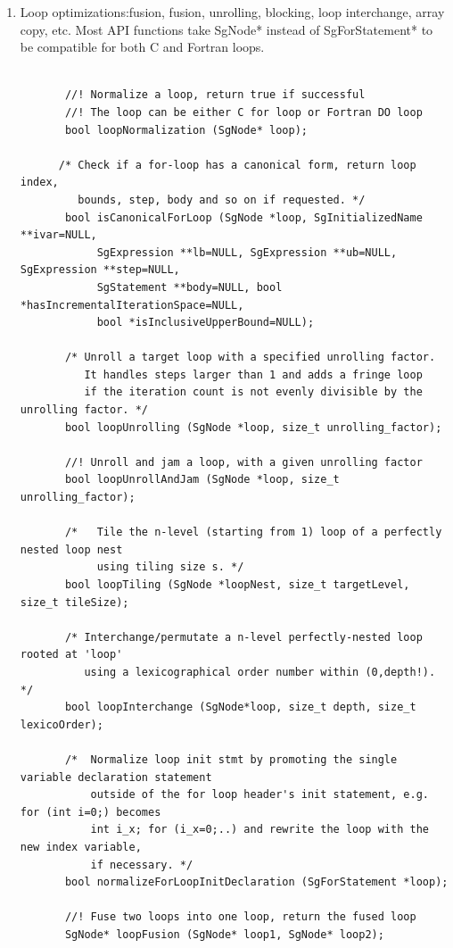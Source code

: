\begin{enumerate}
\begin{enumerate}
\begin{lstlisting}
      \end{lstlisting}
      \item Loop optimizations:fusion, fusion, unrolling, blocking, loop
                  interchange, array copy, etc.
Most API functions take SgNode* instead of SgForStatement* to be compatible for both C and Fortran loops.
       \begin{lstlisting}

       //! Normalize a loop, return true if successful
       //! The loop can be either C for loop or Fortran DO loop
       bool loopNormalization (SgNode* loop);

      /* Check if a for-loop has a canonical form, return loop index, 
         bounds, step, body and so on if requested. */
       bool isCanonicalForLoop (SgNode *loop, SgInitializedName **ivar=NULL, 
            SgExpression **lb=NULL, SgExpression **ub=NULL, SgExpression **step=NULL, 
            SgStatement **body=NULL, bool *hasIncrementalIterationSpace=NULL, 
            bool *isInclusiveUpperBound=NULL);

       /* Unroll a target loop with a specified unrolling factor. 
          It handles steps larger than 1 and adds a fringe loop 
          if the iteration count is not evenly divisible by the unrolling factor. */
       bool loopUnrolling (SgNode *loop, size_t unrolling_factor);

       //! Unroll and jam a loop, with a given unrolling factor
       bool loopUnrollAndJam (SgNode *loop, size_t unrolling_factor);

       /*   Tile the n-level (starting from 1) loop of a perfectly nested loop nest 
            using tiling size s. */
       bool loopTiling (SgNode *loopNest, size_t targetLevel, size_t tileSize);

       /* Interchange/permutate a n-level perfectly-nested loop rooted at 'loop' 
          using a lexicographical order number within (0,depth!). */
       bool loopInterchange (SgNode*loop, size_t depth, size_t lexicoOrder);

       /*  Normalize loop init stmt by promoting the single variable declaration statement 
           outside of the for loop header's init statement, e.g. for (int i=0;) becomes 
           int i_x; for (i_x=0;..) and rewrite the loop with the new index variable, 
           if necessary. */
       bool normalizeForLoopInitDeclaration (SgForStatement *loop);

       //! Fuse two loops into one loop, return the fused loop
       SgNode* loopFusion (SgNode* loop1, SgNode* loop2);
      

\end{lstlisting}
\end{enumerate}
\end{enumerate}
